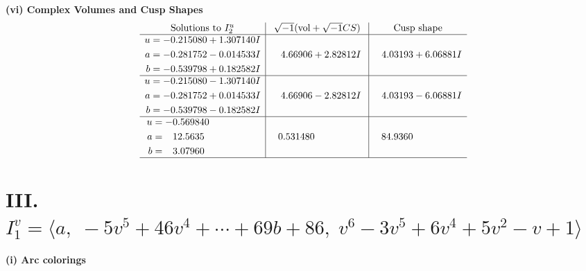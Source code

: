\documentclass[1p]{elsarticle_modified}
\theoremstyle{definition}
\newcommand{\I}{\sqrt{-1}}
\begin{document}
\newpage\flushleft \textbf{(vi) Complex Volumes and Cusp Shapes}
$$\begin{array}{c|c|c}  
\text{Solutions to }I^u_{2}& \I (\text{vol} + \sqrt{-1}CS) & \text{Cusp shape}\\
 \hline 
\begin{aligned}
u &= -0.215080 + 1.307140 I \\
a &= -0.281752 - 0.014533 I \\
b &= -0.539798 + 0.182582 I\end{aligned}
 & \phantom{-}4.66906 + 2.82812 I & \phantom{-}4.03193 + 6.06881 I \\ \hline\begin{aligned}
u &= -0.215080 - 1.307140 I \\
a &= -0.281752 + 0.014533 I \\
b &= -0.539798 - 0.182582 I\end{aligned}
 & \phantom{-}4.66906 - 2.82812 I & \phantom{-}4.03193 - 6.06881 I \\ \hline\begin{aligned}
u &= -0.569840\phantom{ +0.000000I} \\
a &= \phantom{-}12.5635\phantom{ +0.000000I} \\
b &= \phantom{-}3.07960\phantom{ +0.000000I}\end{aligned}
 & \phantom{-}0.531480\phantom{ +0.000000I} & \phantom{-}84.9360\phantom{ +0.000000I}\\
 \hline 
 \end{array}$$\newpage\newpage\renewcommand{\arraystretch}{1}
\centering \section*{III. $I^v_{1}= \langle a,\;-5 v^5+46 v^4+\cdots+69 b+86,\;v^6-3 v^5+6 v^4+5 v^2- v+1 \rangle$}
\flushleft \textbf{(i) Arc colorings}\\
\end{document}
